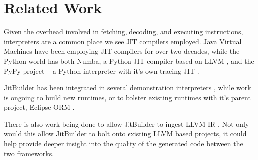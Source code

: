 \section{Related Work}
\label{sec:related-work}
Given the overhead involved in fetching, decoding, and executing instructions, interpreters are a common place we see JIT compilers employed.
Java Virtual Machines \cite{HiPerfJava,SuganumaIBMJit} have been employing JIT compilers for over two decades, while the Python world has both
Numba, a Python JIT compiler based on LLVM \cite{numba,numbaWeb}, and the PyPy project -- a Python interpreter with it's own tracing JIT \cite{pypy}.

JitBuilder has been integrated in several demonstration interpreters \cite{lua-vermhela, wasmjit, base9}, while work is ongoing to build new runtimes, or to bolster existing runtimes with it's parent project, Eclipse ORM \cite{ruby-omr}.

There is also work being done to allow JitBuilder to ingest LLVM IR \cite{llvm-jitbuilder-interop}. 
Not only would this allow JitBuilder to bolt onto existing LLVM based projects, it could help provide deeper insight into the quality of the generated code between the two frameworks.





